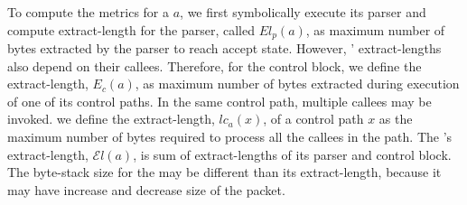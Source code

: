 \documentclass[letterpaper,twocolumn,10pt]{article}
\begin{document}
To compute the metrics for a \uprogram $a$, we first symbolically 
execute its parser and compute extract-length for the parser, called 
$El_{p}(a)$, as maximum number of bytes extracted by the parser to 
reach accept state. However, \uprogram' extract-lengths also depend 
on their callees. Therefore, for the control block, we define the 
extract-length, $E_{c}(a)$, as maximum number of bytes extracted 
during execution of one of its control paths.
In the same control path, multiple callees may be invoked. we define 
the extract-length, $lc_{a}(x)$, of a control path $x$ as the maximum 
number of bytes required to process all the callees in the path. The
\uprogram's extract-length, $\mathcal{E}l(a)$, is sum of 
extract-lengths of its parser and control block.
The byte-stack size for the \uprogram may be different than its 
extract-length, because it may have increase and decrease size of the 
packet. 

\end{document}
